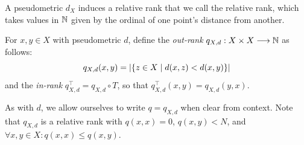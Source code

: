 \documentclass[
]{article}
\begin{document}
A pseudometric \(d_X\) induces a relative rank that we call the relative
rank, which takes values in \(\mathbb{N}\) given by the ordinal of one point's
distance from another.

\begin{definition}
    For $x,y\in X$ with pseudometric $d$, define the \emph{out-rank} $q_{X,d} : X \times X \longrightarrow \mathbb{N}$ as follows:
    \begin{equation}\label{eqn:out-rank}
        q_{X,d}(x,y)=\abs{\{z\in X \mid d(x,z) < d(x,y)\}}%
    \end{equation}
    and the \emph{in-rank} $q_{X,d}^\top = q_{X,d} \circ T$, so that $q_{X,d}^\top(x,y) = q_{X,d}(y,x)$.
\end{definition}

As with \(d\), we allow ourselves to write \(q=q_{X,d}\) when clear from
context. Note that \(q_{X,d}\) is a relative rank with \(q(x,x)=0\),
\(q(x,y) < N\), and \(\forall x,y \in X : q(x,x) \leq q(x,y)\).
\end{document}
